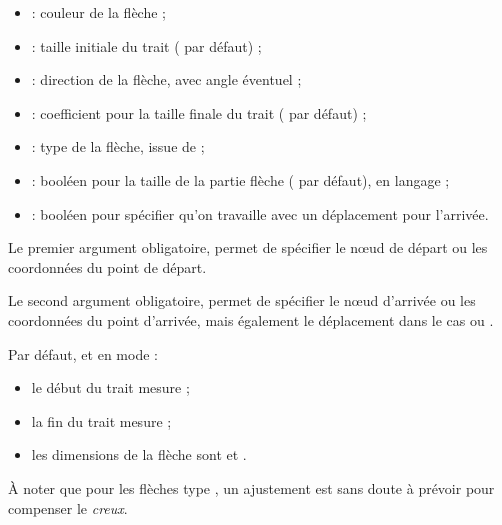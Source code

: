 \documentclass[french,11pt,a4paper]{article}
\begin{document}
\begin{itemize}
	\item {} : couleur de la flèche ;
	\item {} : taille initiale du trait (\MontreCode{0.5mm} par défaut) ;
	\item {} : direction de la flèche, avec angle éventuel ;
	\item {} : coefficient pour la taille finale du trait ( par défaut) ;
	\item {} : type de la flèche, issue de  ;
	\item {} : booléen pour la taille de la partie flèche ( par défaut), en langage  ;
	\item {} : booléen pour spécifier qu'on travaille avec un déplacement pour l'arrivée.
\end{itemize}

Le premier argument obligatoire, permet de spécifier le nœud de départ ou les coordonnées du point de départ.

Le second argument obligatoire, permet de spécifier le nœud d'arrivée ou les coordonnées du point d'arrivée, mais également le déplacement dans le cas ou .

\medskip

Par défaut, et en mode  :

\begin{itemize}
	\item le début du trait mesure  ;
	\item la fin du trait mesure  ;
	\item les dimensions de la flèche sont  et .
\end{itemize}

À noter que pour les flèches type , un ajustement est sans doute à prévoir pour compenser le \textit{creux}.

\begin{DemoCode}{}
\end{DemoCode}
\end{document}
